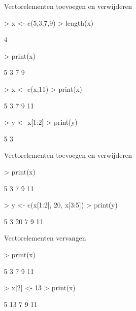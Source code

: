 \documentclass{beamer}
\begin{document}


\begin{frame}[fragile]{Vectorelementen toevoegen en verwijderen}
\begin{Schunk}
\begin{Sinput}
> x <- c(5,3,7,9)
> length(x)
\end{Sinput}
\begin{Soutput}
[1] 4
\end{Soutput}
\begin{Sinput}
> print(x)
\end{Sinput}
\begin{Soutput}
[1] 5 3 7 9
\end{Soutput}
\begin{Sinput}
> x <- c(x,11)
> print(x)
\end{Sinput}
\begin{Soutput}
[1]  5  3  7  9 11
\end{Soutput}
\begin{Sinput}
> y <- x[1:2]
> print(y)
\end{Sinput}
\begin{Soutput}
[1] 5 3
\end{Soutput}
\end{Schunk}



\end{frame}


\begin{frame}[fragile]{Vectorelementen toevoegen en verwijderen}
\begin{Schunk}
\begin{Sinput}
> print(x)
\end{Sinput}
\begin{Soutput}
[1]  5  3  7  9 11
\end{Soutput}
\begin{Sinput}
> y <- c(x[1:2], 20, x[3:5])
> print(y)
\end{Sinput}
\begin{Soutput}
[1]  5  3 20  7  9 11
\end{Soutput}
\end{Schunk}

\end{frame}


\begin{frame}[fragile]{Vectorelementen vervangen}
\begin{Schunk}
\begin{Sinput}
> print(x)
\end{Sinput}
\begin{Soutput}
[1]  5  3  7  9 11
\end{Soutput}
\begin{Sinput}
> x[2] <- 13
> print(x)
\end{Sinput}
\begin{Soutput}
[1]  5 13  7  9 11
\end{Soutput}
\end{Schunk}

\end{frame}
\end{document}
